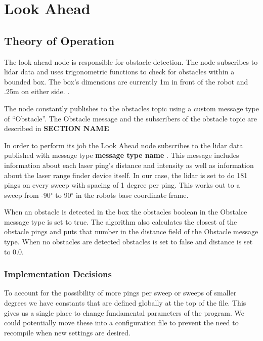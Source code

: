 \section{Look Ahead}
\subsection{Theory of Operation}

The look ahead node is responsible for obstacle detection. The node
subscribes to lidar data and uses trigonometric functions to check for
obstacles within a bounded box.  The box's dimensions are currently 1m
in front of the robot and .25m on either side. .

The node constantly publishes to the obstacles topic using a custom
message type of ``Obstacle''.  The Obstacle message and the
subscribers of the obstacle topic are described in {\bf SECTION NAME}

In order to perform its job the Look Ahead node subscribes to the
lidar data published with message type {\bf message type name}
. This message
includes information about each laser ping's distance and intensity as
well as information about the laser range finder device itself.  In
our case, the lidar is set to do 181 pings on every sweep with spacing
of 1 degree per ping.  This works out to a sweep from -90$^\circ$ to
90$^\circ$ in the robots base coordinate frame.

When an obstacle is detected in the box the obstacles boolean in the
Obstalce message type is set to true. The algorithm also calculates
the closest of the obstacle pings and puts that number in the distance field
of the Obstacle message type. When no obstacles are detected obstacles
is set to false and distance is set to 0.0.

\subsubsection{Implementation Decisions}

To account for the possibility of more pings per sweep or sweeps of
smaller degrees we have constants that are defined globally at the top
of the file.  This gives us a single place to change fundamental
parameters of the program.  We could potentially move these into a
configuration file to prevent the need to recompile when new settings
are desired.

